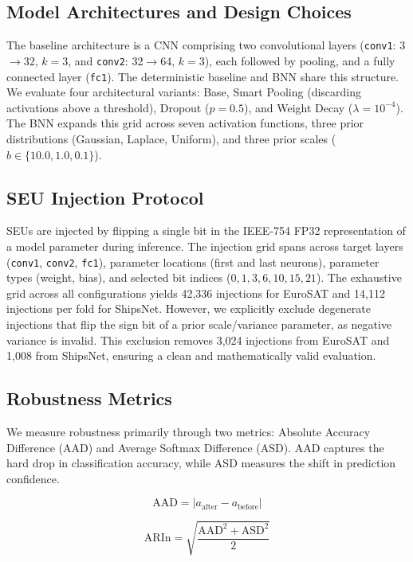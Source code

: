 \documentclass[a4paper,twoside]{article}
\begin{document}
\subsection{Model Architectures and Design Choices}
The baseline architecture is a CNN comprising two convolutional layers (\texttt{conv1}: 3$\to$32, $k{=}3$, and \texttt{conv2}: 32$\to$64, $k{=}3$), each followed by pooling, and a fully connected layer (\texttt{fc1}). The deterministic baseline and BNN share this structure. We evaluate four architectural variants: Base, Smart Pooling (discarding activations above a threshold), Dropout ($p=0.5$), and Weight Decay ($\lambda=10^{-4}$). The BNN expands this grid across seven activation functions, three prior distributions (Gaussian, Laplace, Uniform), and three prior scales ($b \in \{10.0, 1.0, 0.1\}$).

\subsection{SEU Injection Protocol}
SEUs are injected by flipping a single bit in the IEEE-754 FP32 representation of a model parameter during inference. The injection grid spans across target layers (\texttt{conv1}, \texttt{conv2}, \texttt{fc1}), parameter locations (first and last neurons), parameter types (weight, bias), and selected bit indices ($0, 1, 3, 6, 10, 15, 21$). The exhaustive grid across all configurations yields 42,336 injections for EuroSAT and 14,112 injections per fold for ShipsNet. However, we explicitly exclude degenerate injections that flip the sign bit of a prior scale/variance parameter, as negative variance is invalid. This exclusion removes 3,024 injections from EuroSAT and 1,008 from ShipsNet, ensuring a clean and mathematically valid evaluation.

\subsection{Robustness Metrics}
We measure robustness primarily through two metrics: Absolute Accuracy Difference (AAD) and Average Softmax Difference (ASD). AAD captures the hard drop in classification accuracy, while ASD measures the shift in prediction confidence.

\begin{equation}
\label{eq:aad}
\mathrm{AAD} = \lvert a_{\mathrm{after}} - a_{\mathrm{before}} \rvert
\end{equation}

\begin{equation}
\label{eq:arin}
\mathrm{ARIn} = \sqrt{\frac{\mathrm{AAD}^{2} + \mathrm{ASD}^{2}}{2}}
\end{equation}
\end{document}
